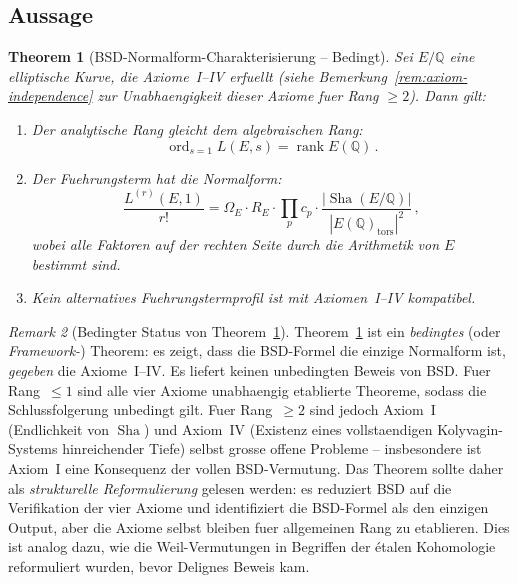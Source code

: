 \documentclass[aps,prd,twocolumn,superscriptaddress,nofootinbib]{revtex4-2}
\newtheorem{theorem}{Theorem}[section]
\theoremstyle{definition}
\theoremstyle{remark}
\newtheorem{remark}[theorem]{Remark}
\DeclareMathOperator{\ord}{ord}
\DeclareMathOperator{\rank}{rank}
\DeclareMathOperator{\Sha}{Sha}
\begin{document}
\subsection{Aussage}

\begin{theorem}[BSD-Normalform-Charakterisierung -- Bedingt]
\label{thm:bsd_normal}
Sei $E/\mathbb{Q}$ eine elliptische Kurve, die Axiome~I--IV erfuellt (siehe Bemerkung~\ref{rem:axiom-independence} zur Unabhaengigkeit dieser Axiome fuer Rang $\geq 2$). Dann gilt:
\begin{enumerate}
\item Der analytische Rang gleicht dem algebraischen Rang:
\begin{equation}
\ord_{s=1} L(E,s) = \rank E(\mathbb{Q})\,.
\end{equation}
\item Der Fuehrungsterm hat die Normalform:
\begin{equation}
\frac{L^{(r)}(E,1)}{r!} = \Omega_E \cdot R_E \cdot \prod_p c_p \cdot \frac{|\Sha(E/\mathbb{Q})|}{|E(\mathbb{Q})_{\mathrm{tors}}|^2}\,,
\end{equation}
wobei alle Faktoren auf der rechten Seite durch die Arithmetik von $E$ bestimmt sind.
\item Kein alternatives Fuehrungstermprofil ist mit Axiomen~I--IV kompatibel.
\end{enumerate}
\end{theorem}

\begin{remark}[Bedingter Status von Theorem~\ref{thm:bsd_normal}]
\label{rem:conditional_status}
Theorem~\ref{thm:bsd_normal} ist ein \textit{bedingtes} (oder \textit{Framework-}) Theorem: es zeigt, dass die BSD-Formel die einzige Normalform ist, \textit{gegeben} die Axiome~I--IV. Es liefert keinen unbedingten Beweis von BSD. Fuer Rang~$\leq 1$ sind alle vier Axiome unabhaengig etablierte Theoreme, sodass die Schlussfolgerung unbedingt gilt. Fuer Rang~$\geq 2$ sind jedoch Axiom~I (Endlichkeit von $\Sha$) und Axiom~IV (Existenz eines vollstaendigen Kolyvagin-Systems hinreichender Tiefe) selbst grosse offene Probleme -- insbesondere ist Axiom~I eine Konsequenz der vollen BSD-Vermutung. Das Theorem sollte daher als \textit{strukturelle Reformulierung} gelesen werden: es reduziert BSD auf die Verifikation der vier Axiome und identifiziert die BSD-Formel als den einzigen Output, aber die Axiome selbst bleiben fuer allgemeinen Rang zu etablieren. Dies ist analog dazu, wie die Weil-Vermutungen in Begriffen der \'etalen Kohomologie reformuliert wurden, bevor Delignes Beweis kam.
\end{remark}
\end{document}
